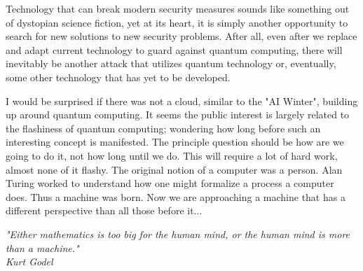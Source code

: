 \documentclass[11pt]{article}
\begin{document}
Technology that can break modern security measures sounds like something out of dystopian science fiction, yet at its heart, it is simply another opportunity to search for new solutions to new security problems. After all, even after we replace and adapt current technology to guard against quantum computing, there will inevitably be another attack that utilizes quantum technology or, eventually, some other technology that has yet to be developed.

I would be surprised if there was not a cloud, similar to the "AI Winter", building
up around quantum computing. It seems the public interest is largely related
to the flashiness of quantum computing; wondering how long before such an interesting
concept is manifested.
The principle question should be how are we going to do it, not how long until we do.
This will require a lot of hard work, almost none of it flashy.
The original notion of a computer was a person. Alan Turing worked to understand
how one might formalize a process a computer does. Thus a machine was born.
Now we are approaching a machine that has a different perspective than all those before it...
\begin{center}
  {\emph{"Either mathematics is too big for the human mind, or the human
    mind is more than a machine." \\ Kurt Godel}}
\end{center}

\newpage
\end{document}
